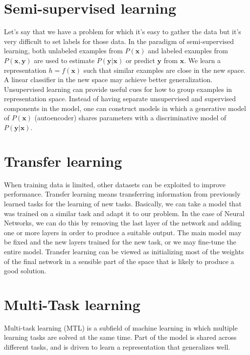 \section{Semi-supervised learning}
Let's say that we have a problem for which it's easy to gather the data but it's very difficult to set labels for those data. In the paradigm of semi-supervised learning, both unlabeled examples from $P(\textbf{x})$ and labeled examples from $P(\textbf{x}, \textbf{y})$ are used to estimate $P(\textbf{y}|\textbf{x})$ or predict $\textbf{y}$ from
$\textbf{x}$.\newline\newline
We learn a representation $h = f(\textbf{x})$ such that similar examples are close in the new space. A linear classifier in the new space may achieve better generalization. Unsupervised learning can provide useful cues for how to group examples in representation
space.\newline\newline
Instead of having separate unsupervised and supervised components in the model, one can construct models in which a generative model of $P(\textbf{x})$ (autoencoder) shares parameters with a discriminative model of $P(\textbf{y} | \textbf{x})$.

\section{Transfer learning}
When training data is limited, other datasets can be exploited to improve performance. Transfer learning means transferring information from previously learned tasks for the learning of new tasks. Basically, we can take a model that was trained on a similar task and adapt it to our problem. In the case of Neural Networks, we can do this by removing the last layer of the network and adding one or more layers in order to produce a suitable output. The main model may be fixed and the new layers trained for the new task, or we may fine-tune the entire model.\newline\newline
Transfer learning can be viewed as initializing most of the weights of the final network in a sensible part of the space that is likely to produce a good solution.

\section{Multi-Task learning}
Multi-task learning (MTL) is a subfield of machine learning in which multiple learning tasks are solved at the same time. Part of the model is shared across different tasks, and is driven to learn a representation that generalizes well.


